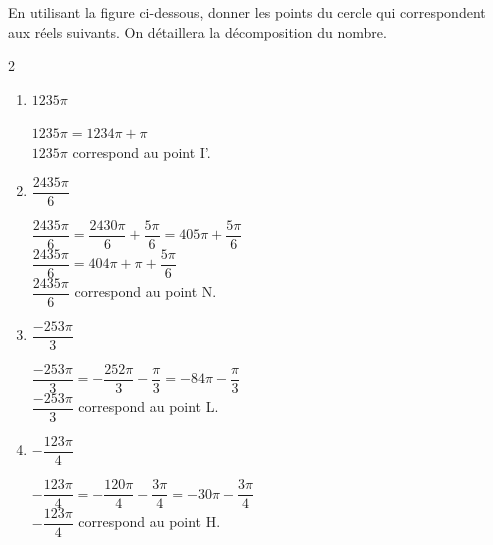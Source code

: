 \documentclass[12pt,a4paper]{article}  %
\begin{document}
\begin{center}

\end{center}

\vspace{-.3cm} 


En utilisant la figure ci-dessous, donner les points du cercle qui correspondent aux réels suivants. On détaillera la décomposition du nombre.
\begin{multicols}{2}
\begin{enumerate}
    \item $1235\pi$\quad {}\\
    \begin{corrBox}
        $1235\pi=1234\pi+\pi$\\ 
        $1235\pi$ correspond au point I'.
    \end{corrBox}
    \item $\dfrac{2435\pi}{6}$\quad {}\\
    \begin{corrBox}
        $\dfrac{2435\pi}{6}=\dfrac{2430\pi}{6}+\dfrac{5\pi}{6}=405\pi+\dfrac{5\pi}{6}$\\
        $\dfrac{2435\pi}{6}=404\pi+\pi+\dfrac{5\pi}{6}$\\
        $\dfrac{2435\pi}{6}$ correspond au point N.
    \end{corrBox}
    \columnbreak
    \item $\dfrac{-253\pi}{3}$\quad {}\\
    \begin{corrBox}
        $\dfrac{-253\pi}{3}=-\dfrac{252\pi}{3}-\dfrac{\pi}{3}=-84\pi-\dfrac{\pi}{3}$\\
        $\dfrac{-253\pi}{3}$ correspond au point L.
    \end{corrBox}
    \item $-\dfrac{123\pi}{4}$\quad {}\\
    \begin{corrBox}
        $-\dfrac{123\pi}{4}=-\dfrac{120\pi}{4}-\dfrac{3\pi}{4}=-30\pi-\dfrac{3\pi}{4}$\\
        $-\dfrac{123\pi}{4}$ correspond au point H.
    \end{corrBox}
\end{enumerate}
\end{multicols}
\end{document}
